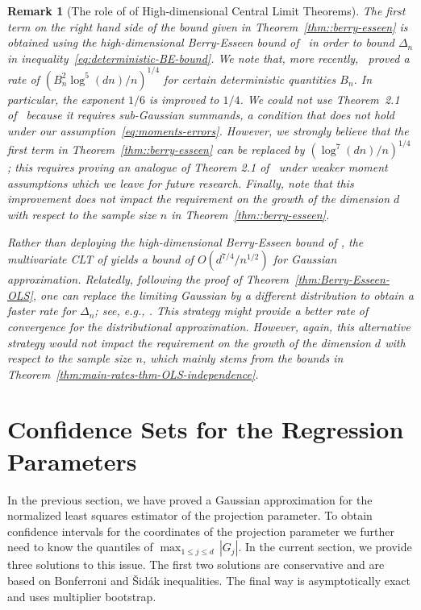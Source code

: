 \documentclass[11pt]{article}
\newtheorem{remark}[theorem]{Remark}
\begin{document}
\begin{remark}[The role of of High-dimensional Central Limit Theorems]
The first term on the right hand side of the bound given in Theorem~\ref{thm::berry-esseen} is obtained using the high-dimensional Berry-Esseen bound of~\cite{koike2019notes} in order to bound $\Delta_n$ in inequality~\eqref{eq:deterministic-BE-bound}. 
We note that, more recently,~\citet[Theorem 2.1]{chernozhukov2019improved} proved a rate of $(B_n^2\log^5(dn)/n)^{1/4}$ for certain deterministic quantities  $B_n$. 
In particular, the exponent $1/6$ is improved to $1/4$. We could not use Theorem~2.1 of~\cite{chernozhukov2019improved} because it requires sub-Gaussian summands, a condition that does not hold under our assumption~\ref{eq:moments-errors}. However, we strongly believe that the first term in Theorem~\ref{thm::berry-esseen} can be replaced by $(\log^7(dn)/n)^{1/4}$; this requires proving an analogue of Theorem 2.1 of~\cite{chernozhukov2019improved} under weaker moment assumptions which we leave for future research. Finally, note that this improvement does not impact the requirement on the growth of the dimension $d$ with respect to the sample size $n$ in Theorem~\ref{thm::berry-esseen}.

Rather than deploying the high-dimensional Berry-Esseen bound of \cite{koike2019notes}, the multivariate CLT of \cite{raivc2019multivariate} yields a bound of $O(d^{7/4}/n^{1/2})$ for Gaussian approximation. Relatedly, following the proof of Theorem~\ref{thm:Berry-Esseen-OLS}, one can replace the limiting Gaussian by a different distribution to obtain a faster rate for $\Delta_n$; see, e.g., \cite{zhilova2016non}. This strategy might provide a better rate of convergence for the distributional approximation. However, again, this alternative strategy would not impact the requirement on the growth of the dimension $d$ with respect to the sample size $n$, which mainly stems from the bounds in Theorem~\ref{thm:main-rates-thm-OLS-independence}.  
\end{remark}


\section{Confidence Sets for the Regression Parameters}\label{sec::confidence-sets-OLS}
In the previous section, we have proved a Gaussian approximation for the normalized least squares estimator of the projection parameter. To obtain confidence intervals for the coordinates of the projection parameter we further need to know the quantiles of $\max_{1\le j\le d}\,|G_j|$. In the current section, we provide three solutions to this issue. The first two solutions are conservative and are based on Bonferroni and {\v{S}}id{\'a}k inequalities. The final way is asymptotically exact and uses multiplier bootstrap.  
\end{document}
